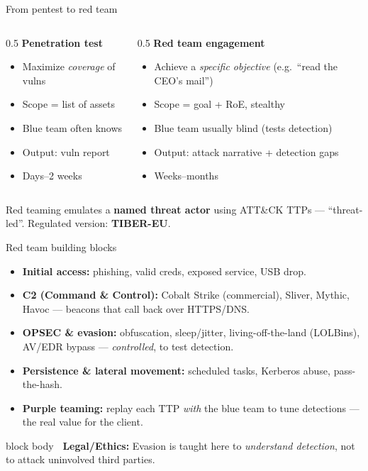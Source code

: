 \documentclass[aspectratio=169,11pt]{beamer}
\newcommand{\legalbox}[1]{%
  \begin{beamercolorbox}[wd=\textwidth,sep=6pt,rounded=true]{block body}%
  \color{warnRed}\textbf{\faExclamationTriangle\ Legal/Ethics:} #1%
  \end{beamercolorbox}}
\begin{document}
\begin{frame}{From pentest to red team}
  \begin{columns}[T]
    \begin{column}{0.5\textwidth}
      \textbf{Penetration test}
      \begin{itemize}\footnotesize
        \item Maximize \emph{coverage} of vulns
        \item Scope = list of assets
        \item Blue team often knows
        \item Output: vuln report
        \item Days--2 weeks
      \end{itemize}
    \end{column}
    \begin{column}{0.5\textwidth}
      \textbf{Red team engagement}
      \begin{itemize}\footnotesize
        \item Achieve a \emph{specific objective} (e.g.\ ``read the CEO's
              mail'')
        \item Scope = goal + RoE, stealthy
        \item Blue team usually blind (tests detection)
        \item Output: attack narrative + detection gaps
        \item Weeks--months
      \end{itemize}
    \end{column}
  \end{columns}
  \vspace{0.5em}
  Red teaming emulates a \textbf{named threat actor} using ATT\&CK TTPs ---
  ``threat-led''. Regulated version: \textbf{TIBER-EU}.
\end{frame}

\begin{frame}{Red team building blocks}
  \begin{itemize}
    \item \textbf{Initial access:} phishing, valid creds, exposed service,
          USB drop.
    \item \textbf{C2 (Command \& Control):} Cobalt Strike (commercial),
          Sliver, Mythic, Havoc --- beacons that call back over HTTPS/DNS.
    \item \textbf{OPSEC \& evasion:} obfuscation, sleep/jitter, living-off-the-land
          (LOLBins), AV/EDR bypass --- \emph{controlled}, to test detection.
    \item \textbf{Persistence \& lateral movement:} scheduled tasks, Kerberos
          abuse, pass-the-hash.
    \item \textbf{Purple teaming:} replay each TTP \emph{with} the blue team to
          tune detections --- the real value for the client.
  \end{itemize}
  \legalbox{\footnotesize Evasion is taught here to \emph{understand detection},
  not to attack uninvolved third parties.}
\end{frame}
\end{document}
